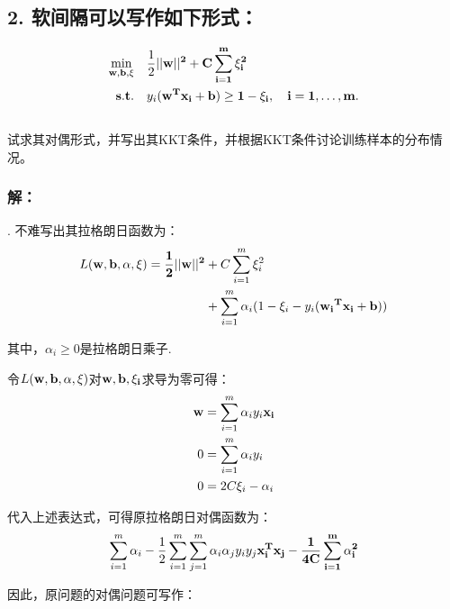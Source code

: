 \documentclass[12pt,a4paper]{article}
\begin{document}
\begin{spacing}{1.3}
\subsection*{2. 软间隔可以写作如下形式：}
\begin{equation}
    \begin{split}
        \min_{\bf{w},b,\xi} &\quad \dfrac{1}{2}||\bf{w}||^{2} + C\sum\limits_{i=1}^{m} \xi_{i}^{2} \\
        \bf{s.t.} &\quad y_{i}(\bf{w^{T}x_{i}}+b) \ge 1-\xi_{i} , \quad i = 1,\dots,m. \nonumber
    \end{split}
\end{equation}
\\
试求其对偶形式，并写出其KKT条件，并根据KKT条件讨论训练样本的分布情况。
\\
\subsubsection*{解：}
\par {}. 不难写出其拉格朗日函数为：
\begin{equation}
    \begin{split}
        L(\bf{w},b,\bf{\alpha},\bf{\xi}) = \dfrac{1}{2} ||\bf{w}||^{2} &+ C\sum \limits_{i=1}^{m} \xi_{i}^{2} \\
        &+ \sum\limits_{i=1}^{m} \alpha_{i}(1-\xi_{i}-y_{i}(\bf{w_{i}}^T\bf{x_{i}}+b)) \nonumber
    \end{split}
\end{equation}
\par 其中，$\alpha_{i} \ge 0$是拉格朗日乘子.
\par 令$L(\bf{w},b,\bf{\alpha},\bf{\xi})$对$\bf{w},b,\bf{\xi_{i}}$求导为零可得：
\begin{equation}
    \begin{split}
        \bf{w} &= \sum\limits_{i=1}^{m}\alpha_{i}y_{i}\bf{x_{i}} \\
        0 &= \sum\limits_{i=1}^{m} \alpha_{i}y_{i}     \\
        0 &= 2C\xi_{i}-\alpha_{i} \nonumber
    \end{split}
\end{equation}
\par 代入上述表达式，可得原拉格朗日对偶函数为：
$$\sum\limits_{i=1}^{m}\alpha_{i} - 
\dfrac{1}{2}\sum\limits_{i=1}^{m}\sum\limits_{j=1}^{m}\alpha_{i}\alpha_{j}y_{i}y_{j}\bf{x_{i}^{T}x_{j}}
-\dfrac{1}{4C}\sum\limits_{i=1}^{m}  \alpha_{i}^{2}
$$
\par 因此，原问题的对偶问题可写作：

\end{spacing}
\end{document}
